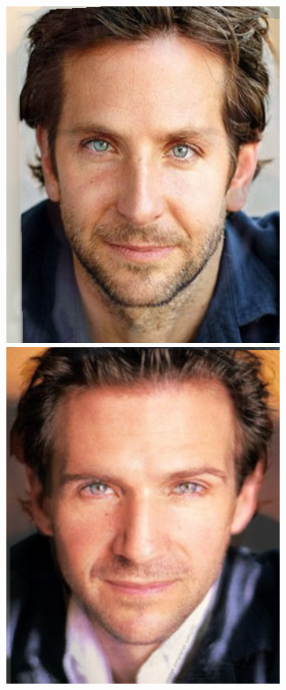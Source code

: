 \documentclass[conference]{IEEEtran}
\begin{document}
\begin{figure}[H]
\begin{multicols}{3}
    \includegraphics[width=1.0\linewidth]{results/faces/G/img10.png} \par
    \includegraphics[width=1.0\linewidth]{results/faces/G/img40.png} \par


\end{multicols}
\end{figure}
\end{document}
